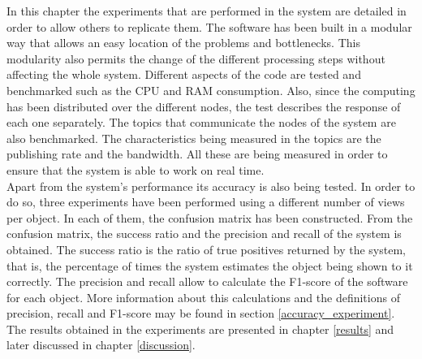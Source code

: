 
In this chapter the experiments that are performed in the system are detailed in order to allow others to replicate them. 
The software has been built in a modular way that allows an easy location of the problems and bottlenecks.
This modularity also permits the change of the different processing steps without affecting the whole system.  
Different aspects of the code are tested and benchmarked such as the CPU and RAM consumption. 
Also, since the computing has been distributed over the different nodes, the test describes the response of each one separately. 
The topics that communicate the nodes of the system are also benchmarked. 
The characteristics being measured in the topics are the publishing rate and the bandwidth. 
All these are being measured in order to ensure that the system is able to work on real time. 
\\%

Apart from the system's performance its accuracy is also being tested. 
In order to do so, three experiments have been performed using a different number of views per object. 
In each of them, the confusion matrix has been constructed. 
From the confusion matrix, the success ratio and the precision and recall of the system is obtained. 
The success ratio is the ratio of true positives returned by the system, that is, the percentage of times the system estimates the object being shown to it correctly. 
The precision and recall allow to calculate the F1-score of the software for each object. 
More information about this calculations and the definitions of precision, recall and F1-score may be found in section \ref{accuracy_experiment}.
\\

The results obtained in the experiments are presented in chapter \ref{results} and later discussed in chapter \ref{discussion}.
\\%


